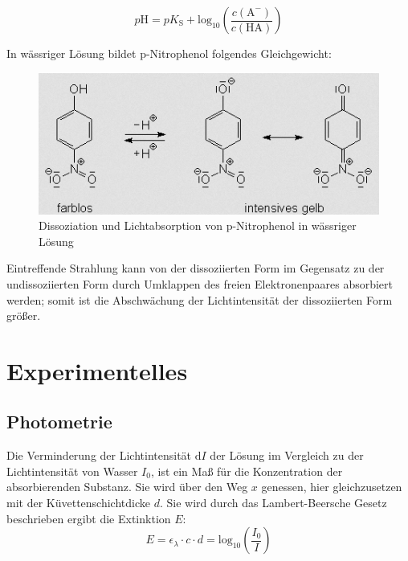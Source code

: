 \documentclass[12pt,a4paper,titlepage,headinclude,bibtotoc]{scrartcl}
\begin{document}
\begin{equation}
p\mathrm{H} = pK_\mathrm{S} + \mathrm{log}_\mathrm{10}\left(\frac{c\mathrm{(A^-)}}{c\mathrm{(HA)}}\right)
\end{equation}

In wässriger Lösung bildet p-Nitrophenol folgendes Gleichgewicht: 

\begin{figure} [h!]
\begin{center}
\includegraphics[scale=1]{Strukturformel2.png} \end{center}
\caption {Dissoziation und Lichtabsorption von p-Nitrophenol in wässriger Lösung\,\protect\footnotemark}
\end{figure}


Eintreffende Strahlung kann von der dissoziierten Form im Gegensatz zu der undissoziierten Form durch Umklappen des freien Elektronenpaares absorbiert werden; somit ist die Abschwächung der Lichtintensität der dissoziierten Form größer.

\section{Experimentelles}
\subsection{Photometrie}
Die Verminderung der Lichtintensität $\mathrm{d}I$ der Lösung im Vergleich zu der Lichtintensität von Wasser $I_0$, ist ein Maß für die Konzentration der absorbierenden Substanz. Sie wird über den Weg $x$ genessen, hier gleichzusetzen mit der Küvettenschichtdicke $d$. Sie wird durch das Lambert-Beersche Gesetz beschrieben ergibt die Extinktion $E$:\\

\begin{equation}
E = \epsilon _{\lambda} \cdot c \cdot d = \mathrm{log_{10}}\left( \frac{I_0}{I}\right)
\end{equation}
\end{document}
